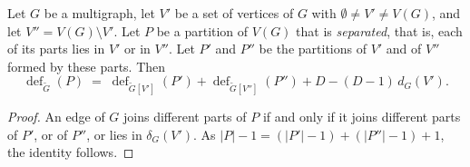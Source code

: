 \begin{lemma}
  \label{lem:separated-partition-value}
  \leanok
  Let $G$ be a multigraph, let $V'$ be a set of vertices of $G$ with
  $\emptyset \neq V' \neq V(G)$, and let $V'' = V(G) \setminus V'$. Let
  $P$ be a partition of $V(G)$ that is \emph{separated}, that is, each
  of its parts lies in $V'$ or in $V''$. Let $P'$ and $P''$ be the
  partitions of $V'$ and of $V''$ formed by these parts. Then
  \[
    \operatorname{def}_{\tilde G}(P) \;=\;
    \operatorname{def}_{\tilde G[V']}(P')
    + \operatorname{def}_{\tilde G[V'']}(P'')
    + D - (D-1)\,d_G(V').
  \]
\end{lemma}
\begin{proof}
  \leanok
  An edge of $G$ joins different parts of $P$ if and only if it joins
  different parts of $P'$, or of $P''$, or lies in $\delta_G(V')$. As
  $|P| - 1 = (|P'| - 1) + (|P''| - 1) + 1$, the identity follows.
\end{proof}

